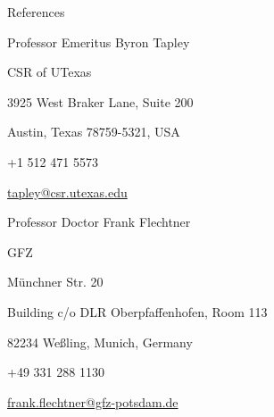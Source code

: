 
\begin{cvtext}{References}

\begin{ittj}
  \item Professor Emeritus Byron Tapley 
  \item \acl{CSR} of \acl{UTexas}
  \item 3925 West Braker Lane, Suite 200
  \item Austin, Texas 78759-5321, \ac{USA}
  \item +1 512 471 5573
  \item \href{mailto:tapley@csr.utexas.edu}{tapley@csr.utexas.edu}
\end{ittj}

\begin{ittj}
  \item Professor Doctor Frank Flechtner
  \item \acl{GFZ}
  \item Münchner Str. 20
  \item Building c/o DLR Oberpfaffenhofen, Room 113
  \item 82234 Weßling, Munich, Germany
  \item +49 331 288 1130
  \item \href{mailto:frank.flechtner@gfz-potsdam.de}{frank.flechtner@gfz-potsdam.de}
\end{ittj}




\end{cvtext}